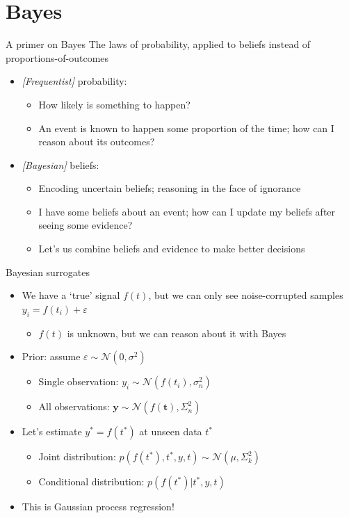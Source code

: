 \documentclass[presentation]{beamer}
\begin{document}
\section{Bayes}
\label{sec:org261c9cf}
\begin{frame}[label={sec:org60a294a}]{A primer on Bayes}
The laws of probability, applied to beliefs instead of proportions-of-outcomes
\vfill
\begin{itemize}
\item \emph{[Frequentist]} probability:
\begin{itemize}
\item How likely is something to happen?
\item An event is known to happen some proportion of the time; how can I reason about its outcomes?
\end{itemize}
\end{itemize}
\vfill
\begin{itemize}
\item \emph{[Bayesian]} beliefs:
\begin{itemize}
\item Encoding uncertain beliefs; reasoning in the face of ignorance
\item I have some beliefs about an event; how can I update my beliefs after seeing some evidence?
\item Let's us combine beliefs and evidence to make better decisions
\end{itemize}
\end{itemize}
\end{frame}

\begin{frame}[<+->][label={sec:orgf423900}]{Bayesian surrogates}
\begin{itemize}
\item We have a `true' signal \(f(t)\), but we can only see noise-corrupted samples \(y_i = f(t_i) + \varepsilon\)
\begin{itemize}
\item \(f(t)\) is unknown, but we can reason about it with Bayes
\end{itemize}
\item Prior: assume \(\varepsilon\sim\mathcal{N}(0, \sigma^2)\)
\begin{itemize}
\item Single observation: \(y_i \sim \mathcal{N}(f(t_i), \sigma_n^2)\)
\item All observations: \(\mathbf{y} \sim \mathcal{N}(f(\mathbf{t}), \Sigma_n^2)\)
\end{itemize}
\item Let's estimate \(y^*=f(t^*)\) at unseen data \(t^*\)
\begin{itemize}
\item Joint distribution: \(p(f(t^*),t^*,y,t) \sim \mathcal{N}(\mu, \Sigma_k^2)\)
\item Conditional distribution: \(p(f(t^*)|t^*, y, t)\)
\end{itemize}
\item This is Gaussian process regression!
\end{itemize}
\end{frame}
\end{document}
